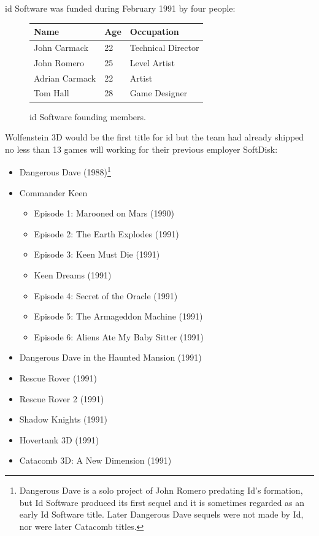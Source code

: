 \documentclass[book.tex]{subfiles}
\begin{document}
id Software was funded during February 1991 by four people: 

 \begin{figure}[H]
\centering  
\begin{tabularx}{\textwidth}{ X  X  X  }
  \toprule
  \textbf{Name} &  \textbf{Age} & \textbf{Occupation} \\
  \toprule 
   John Carmack & 22 &  Technical Director\\
   John Romero & 25 &  Level Artist\\
   Adrian Carmack & 22 &  Artist\\
   Tom Hall & 28 &  Game Designer\\
     \toprule
\end{tabularx}
\caption{id Software founding members.}\label{fig:Id Software team}
\end{figure}

Wolfenstein 3D would be the first title for id but the team had already shipped no less than 13 games will working for their previous employer SoftDisk:\\
\begin{itemize}
  \item Dangerous Dave (1988)\footnote{Dangerous Dave is a solo project of John Romero predating Id's formation, but Id Software produced its first sequel and it is sometimes regarded as an early Id Software title. Later Dangerous Dave sequels were not made by Id, nor were later Catacomb titles.}
  \item Commander Keen
  \begin{itemize}
    \item Episode 1: Marooned on Mars (1990)
    \item Episode 2: The Earth Explodes (1991)
    \item Episode 3: Keen Must Die (1991)
    \item Keen Dreams (1991)
    \item Episode 4: Secret of the Oracle (1991)
    \item Episode 5: The Armageddon Machine (1991)
    \item Episode 6: Aliens Ate My Baby Sitter (1991)
  \end{itemize}
  
  \item Dangerous Dave in the Haunted Mansion (1991)
  \item Rescue Rover (1991)
  \item Rescue Rover 2 (1991)
  \item Shadow Knights (1991)
  \item Hovertank 3D (1991)
  \item Catacomb 3D: A New Dimension (1991)
\end{itemize}
\end{document}

